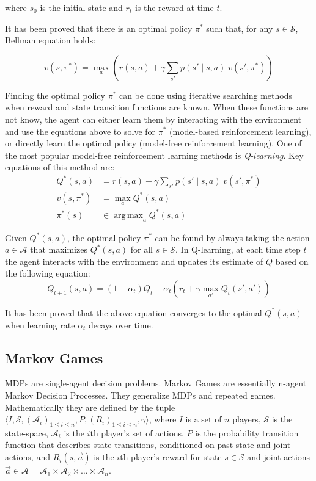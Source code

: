 \documentclass{article}
\DeclareMathOperator*{\argmax}{arg\,max}
\begin{document}
    where $s_{0}$ is the initial state and $r_{t}$ is the reward at time $t$.

    It has been proved that there is an optimal policy $\pi^{*}$ such that, for any $s \in \mathcal{S}$, Bellman equation holds:

    \begin{equation}
        v(s, \pi^{*}) = \max_{a} \left ( r(s, a) + \gamma \sum_{s'} p(s' \; | \; s, a) \; v(s', \pi^{*}) \right)
    \end{equation}

    Finding the optimal policy $\pi^{*}$ can be done using iterative searching methods when reward and state transition functions are known.
    When these functions are not know, the agent can either learn them by interacting with the environment and use the equations above to solve for $\pi^{*}$ (model-based reinforcement learning), or directly learn the optimal policy (model-free reinforcement learning).
    One of the most popular model-free reinforcement learning methods is \emph{Q-learning}.
    Key equations of this method are:
    \begin{align}
        Q^{*}(s, a) &= r(s, a) + \gamma \sum_{s'} p(s' \; | \; s, a) \; v(s', \pi^{*}) \\
        v(s, \pi^{*}) &= \max_a Q^{*}(s, a) \\
        \pi^{*}(s) &\in \argmax_a Q^{*}(s, a) \label{eq1}
    \end{align}

    Given $Q^{*}(s, a)$, the optimal policy $\pi^{*}$ can be found by always taking the action $a \in \mathcal{A}$ that maximizes $Q^{*}(s, a)$ for all $s \in \mathcal{S}$.
    In Q-learning, at each time step $t$ the agent interacts with the environment and updates its estimate of $Q$ based on the following equation:
    \begin{equation}
        Q_{t+1}(s, a) = (1 - \alpha_{t}) Q_{t} + \alpha_{t} \left( r_{t} + \gamma \max_{a'} Q_{t}(s', a') \right)
    \end{equation}

    It has been proved that the above equation converges to the optimal $Q^{*}(s, a)$ when learning rate $\alpha_{t}$ decays over time.

    \subsection{Markov Games}
    \label{subsec:games}

    MDPs are single-agent decision problems.
    Markov Games are essentially n-agent Markov Decision Processes.
    They generalize MDPs and repeated games.
    Mathematically they are defined by the tuple $\langle I, \mathcal{S}, (\mathcal{A}_{i})_{1 \leq i \leq n}, P, (R_{i})_{1 \leq i \leq n}, \gamma \rangle$, where $I$ is a set of $n$ players, $\mathcal{S}$ is the state-space, $\mathcal{A}_{i}$ is the $i$th player's set of actions, $P$ is the probability transition function that describes state transitions, conditioned on past state and joint actions, and $R_{i}(s, \vec{a})$ is the $i$th player's reward for state $s \in \mathcal{S}$ and joint actions $\vec{a} \in \mathcal{A} = \mathcal{A}_{1} \times \mathcal{A}_{2} \times \ldots \times \mathcal{A}_{n}$.
\end{document}
